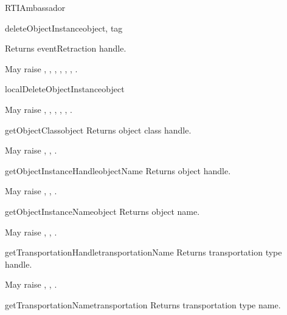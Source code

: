\begin{classdesc}{RTIAmbassador}{}
\begin{methoddesc}{deleteObjectInstance}{object, tag}

Returns eventRetraction handle.

May raise
,
,
,
,
,
,
.
\end{methoddesc}

\begin{methoddesc}{localDeleteObjectInstance}{object}

May raise
,
,
,
,
,
.
\end{methoddesc}

\begin{methoddesc}{getObjectClass}{object}
Returns object class handle.

May raise
,
,
.
\end{methoddesc}

\begin{methoddesc}{getObjectInstanceHandle}{objectName}
Returns object handle.

May raise
,
,
.
\end{methoddesc}

\begin{methoddesc}{getObjectInstanceName}{object}
Returns object name.

May raise
,
,
.
\end{methoddesc}

\begin{methoddesc}{getTransportationHandle}{transportationName}
Returns transportation type handle.

May raise
,
,
.
\end{methoddesc}

\begin{methoddesc}{getTransportationName}{transportation}
Returns transportation type name.


\end{methoddesc}
\end{classdesc}
